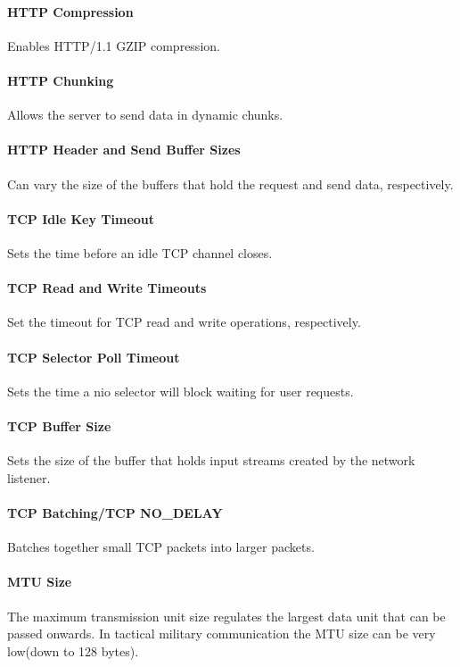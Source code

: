 \paragraph{HTTP Compression} Enables HTTP/1.1 GZIP compression.

\paragraph{HTTP Chunking} Allows the server to send data in dynamic chunks.

\paragraph{HTTP Header and Send Buffer Sizes} Can vary the size of the buffers
that hold the request and send data, respectively.

\paragraph{TCP Idle Key Timeout} Sets the time before an idle TCP channel
closes.

\paragraph{TCP Read and Write Timeouts} Set the timeout for TCP read and write
operations, respectively.

\paragraph{TCP Selector Poll Timeout} Sets the time a \gls{nio} selector will
block waiting for user requests.

\paragraph{TCP Buffer Size} Sets the size of the buffer that holds input streams
created by the network listener.

\paragraph{TCP Batching/TCP NO\_DELAY} Batches together small TCP packets into
larger packets.

\paragraph{MTU Size} The maximum transmission unit size regulates the largest
data unit that can be passed onwards. In tactical military communication the MTU
size can be very low(down to 128 bytes).

